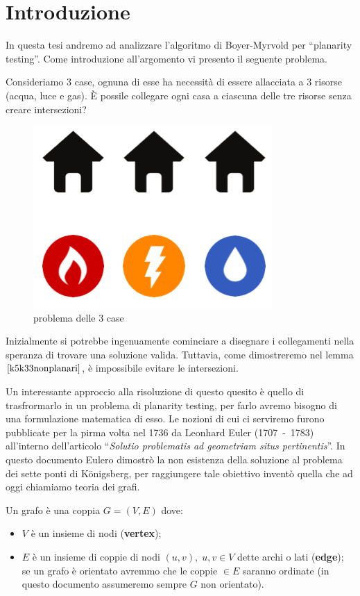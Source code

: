 \chapter{Introduzione}
In questa tesi andremo ad analizzare l'algoritmo di Boyer-Myrvold per “planarity testing”. Come introduzione all'argomento vi presento il seguente problema.
\begin{problema}\label{problemaCase}
    Consideriamo 3 case, ognuna di esse ha necessità di essere allacciata a 3 risorse (acqua, luce e gas). È possile collegare ogni casa a ciascuna delle tre risorse senza creare intersezioni?
    \begin{figure}[H]
        \centering
        \includegraphics[scale=0.4]{img/3case.png}
        \caption{problema delle 3 case}
    \end{figure}
    \noindent Inizialmente si potrebbe ingenuamente cominciare a disegnare i collegamenti nella speranza di trovare una soluzione valida. Tuttavia, come dimostreremo nel lemma \(\ref{k5k33nonplanari}\), è impossibile evitare le intersezioni.
\end{problema}
Un interessante approccio alla risoluzione di questo quesito è quello di trasfrormarlo in un problema di planarity testing, per farlo avremo bisogno di una formulazione matematica di esso.
Le nozioni di cui ci serviremo furono pubblicate per la pirma volta nel 1736 da Leonhard Euler (1707~-~1783) all'interno dell'articolo “\textit{Solutio problematis ad geometriam situs pertinentis}\cite{ponti}”. In questo documento Eulero dimostrò la non esistenza della soluzione al problema dei sette ponti di Königsberg, per raggiungere tale obiettivo inventò quella che ad oggi chiamiamo teoria dei grafi.
\begin{definizione}[Grafo]
    Un grafo è una coppia \(G=(V,E)\) dove:
    \begin{itemize}
        \item \(V\) è un insieme di nodi (\textbf{vertex});
        \item \(E\) è un insieme di coppie di nodi \((u,v),\;u,v\in V\) dette archi o lati (\textbf{edge}); se un grafo è orientato avremmo che le coppie \(<u,v>\in E\) saranno ordinate (in questo documento assumeremo sempre \(G\) non orientato).
    \end{itemize}
\end{definizione}
